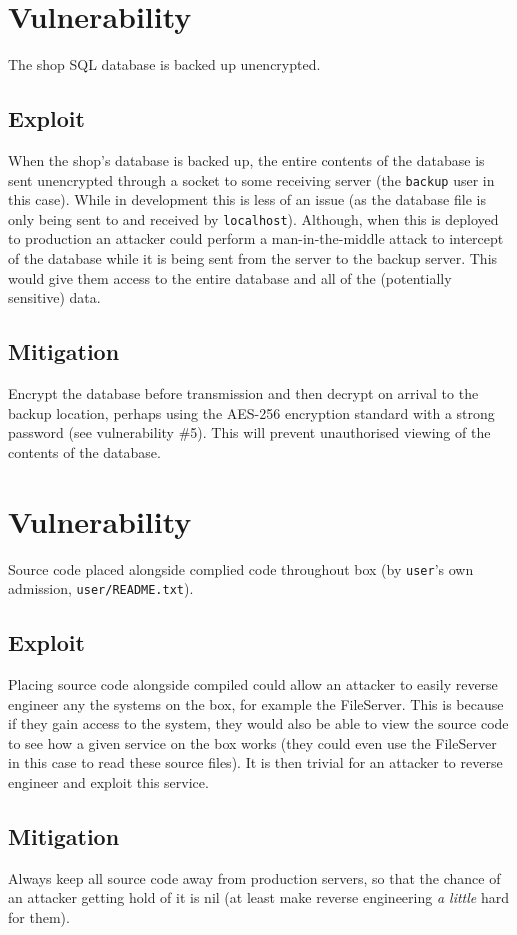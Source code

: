 \documentclass[11pt]{article}
\begin{document}
\section{Vulnerability}

The shop SQL database is backed up unencrypted.

\subsection{Exploit}

When the shop's database is backed up, the entire contents of the database is sent unencrypted through a socket to some receiving server (the \texttt{backup} user in this case). While in development this is less of an issue (as the database file is only being sent to and received by \texttt{localhost}). Although, when this is deployed to production an attacker could perform a man-in-the-middle attack to intercept of the database while it is being sent from the server to the backup server. This would give them access to the entire database and all of the (potentially sensitive) data.

\subsection{Mitigation}

Encrypt the database before transmission and then decrypt on arrival to the backup location, perhaps using the AES-256 encryption standard with a strong password (see vulnerability \#5). This will prevent unauthorised viewing of the contents of the database.

\section{Vulnerability}

Source code placed alongside complied code throughout box (by \texttt{user}'s own admission, \texttt{user/README.txt}).

\subsection{Exploit}

Placing source code alongside compiled could allow an attacker to easily reverse engineer any the systems on the box, for example the FileServer. This is because if they gain access to the system, they would also be able to view the source code to see how a given service on the box works (they could even use the FileServer in this case to read these source files). It is then trivial for an attacker to reverse engineer and exploit this service.

\subsection{Mitigation}

Always keep all source code away from production servers, so that the chance of an attacker getting hold of it is nil (at least make reverse engineering \textit{a little} hard for them).
\end{document}
